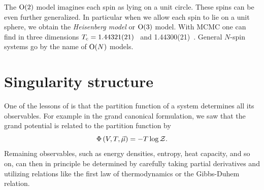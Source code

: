 The $\operatorname{\text{O}}(2)$ model imagines each spin as lying on a unit circle. These spins can be
even further generalized. In particular when we allow each spin to lie on a unit
sphere, we obtain the {\it Heisenberg model}
or $\operatorname{\text{O}}(3)$ model. With MCMC one can find in three dimensions
$T_{\rm c}=1.44321(21)$~\cite{peczak_high-accuracy_1991}
and 1.44300(21)~\cite{holm_critical_1993}.
General $N$-spin systems go by the name of $\operatorname{\text{O}}(N)$ models.



\section{Singularity structure}\label{sec:leeyang}

One of the lessons of  is that the partition function of a
system determines all its observables. For example in the grand canonical
formulation, we saw that the grand potential is related to the partition
function by
\begin{equation}\label{eq:grandPotZ}
  \Phi\left(V,T,\vec{\mu}\right)=-T\log\mathcal{Z}.
\end{equation}
Remaining observables, such as energy densities, entropy, heat capacity, and so
on, can then in principle be determined by carefully taking partial derivatives
and utilizing relations like the first law of thermodynamics or the Gibbs-Duhem
relation.


